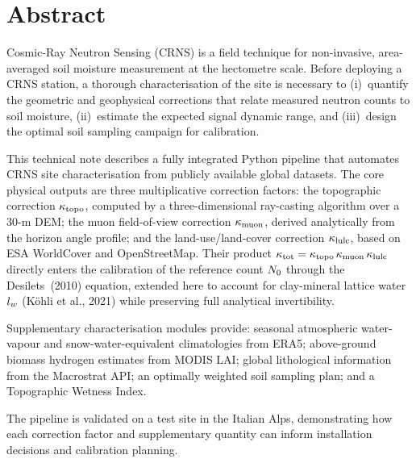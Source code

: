\section*{Abstract}

Cosmic-Ray Neutron Sensing (CRNS) is a field technique for non-invasive,
area-averaged soil moisture measurement at the hectometre scale.
Before deploying a CRNS station, a thorough characterisation of the site
is necessary to (i)~quantify the geometric and geophysical corrections
that relate measured neutron counts to soil moisture, (ii)~estimate the
expected signal dynamic range, and (iii)~design the optimal soil sampling
campaign for calibration.

This technical note describes a fully integrated Python pipeline that
automates CRNS site characterisation from publicly available global
datasets.
The core physical outputs are three multiplicative correction factors:
the topographic correction $\kappa_\mathrm{topo}$, computed by a three-dimensional
ray-casting algorithm over a 30-m DEM; the muon field-of-view correction
$\kappa_\mathrm{muon}$, derived analytically from the horizon angle profile; and the
land-use/land-cover correction $\kappa_\mathrm{lulc}$, based on ESA WorldCover and
OpenStreetMap.
Their product $\kappa_\mathrm{tot} = \kappa_\mathrm{topo}\,\kappa_\mathrm{muon}\,\kappa_\mathrm{lulc}$ directly enters the calibration
of the reference count $N_0$ through the Desilets~(2010) equation,
extended here to account for clay-mineral lattice water $l_w$
(K\"ohli et al., 2021) while preserving full analytical invertibility.

Supplementary characterisation modules provide: seasonal atmospheric
water-vapour and snow-water-equivalent climatologies from ERA5;
above-ground biomass hydrogen estimates from MODIS LAI;
global lithological information from the Macrostrat API; an optimally
weighted soil sampling plan; and a Topographic Wetness Index.

The pipeline is validated on a test site in the Italian Alps, demonstrating
how each correction factor and supplementary quantity can inform
installation decisions and calibration planning.
